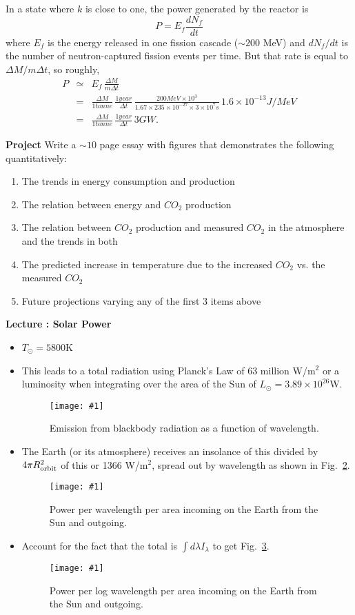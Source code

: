 \documentclass[11pt]{book}
\def\be{\begin{equation}}
\def\ee{\end{equation}}
\def\bea{\begin{eqnarray}}
\def\eea{\end{eqnarray}}
\newcommand{\vs}{\nonumber\\}
\newcommand{\sfig}[2]{
\texttt{[image: \#1]}
        }
\newcommand{\Spng}[2]{
   \begin{figure}[thbp]
   \begin{center}
    \sfig{../Figures/#1.png}{0.7\columnwidth}
    \caption{{\small #2}}
    \label{fig:#1}
     \end{center}
   \end{figure}
}
\newcommand{\rf}[1]{\ref{fig:#1}}
\newcommand\bei{\begin{itemize}}
\newcommand\eei{\end{itemize}}
\newcommand\bee{\begin{enumerate}}
\newcommand\eee{\end{enumerate}}
\newcommand\lecture[1]{\newpage
\addtocounter{lectureno}{1}
\setcounter{secno}{0}
\begin{center}
 {\bf Lecture \arabic{lectureno}: #1}
\end{center}
}
\newcounter{lectureno}
\newcounter{secno}
\newcommand\lsection[1]{
\addtocounter{secno}{1}
{\bf \arabic{lectureno}.\alph{secno} #1:}}
\begin{document}
In a state where $k$ is close to one, the power generated by the reactor is
\be
P = E_f \frac{dN_f}{dt}
\ee
where $E_f$ is the energy released in one fission cascade ($\sim200$ MeV) and $dN_f/dt$ is the number of neutron-captured fission events per time. But that rate is equal to $\Delta M/m\Delta t$, so roughly,
\bea
P&\simeq & E_f\, \frac{\Delta M}{m\Delta t}\vs
&=&
\frac{\Delta M}{1 tonne}\,\frac{1 year}{\Delta t}\, \frac{200 MeV\times 10^3 }{1.67\times 235\times 10^{-27}\times 3\times 10^7 s}\,1.6\times 10^{-13} J/MeV
\vs
&=&
\frac{\Delta M}{1 tonne}\,\frac{1 year}{\Delta t}\, 3GW.
\eea


\hrulefill

{\bf Project}
Write a $\sim10$ page essay with figures that demonstrates the following quantitatively:
\bee
\item The trends in energy consumption and production 
\item The relation between energy and $CO_2$ production
\item The relation between $CO_2$ production and measured $CO_2$ in the atmosphere and the trends in both
\item The predicted increase in temperature due to the increased $CO_2$ vs. the measured $CO_2$
\item Future projections varying any of the first 3 items above
\eee




\lecture{Solar Power}

\bei
\item $T_\odot=5800$K
\item This leads to a total radiation using Planck's Law of 63 million W/m$^2$ or a luminosity when integrating over the area of the Sun of $L_\odot=3.89\times 10^{26}$W.
\Spng{balance0}{Emission from blackbody radiation as a function of wavelength.}
\item The Earth (or its atmosphere) receives an insolance of this divided by $4\pi R_{\rm orbit}^2$ of this or 1366 W/m$^2$, spread out by wavelength as shown in Fig.~\rf{balance1}.
\Spng{balance1}{Power per wavelength per area incoming on the Earth from the Sun and outgoing.}
\item Account for the fact that the total is $\int d\lambda I_\lambda$ to get Fig.~\rf{balance2}.
\Spng{balance2}{Power per log wavelength per area incoming on the Earth from the Sun and outgoing.}
\eei
\end{document}
